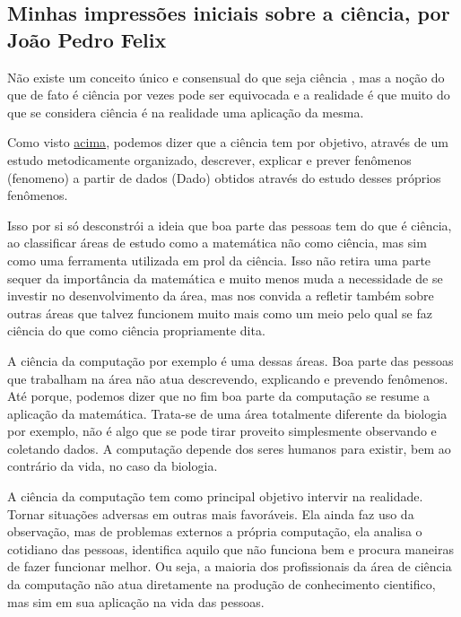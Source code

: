 \subsection{Minhas impressões iniciais sobre a ciência, por João Pedro Felix}

Não existe um conceito único e consensual do que seja ciência \citep{schwartzman_ciencia_1984}, mas a noção do que de fato é ciência por vezes pode ser equivocada e a realidade é que muito do que se considera ciência é na realidade uma aplicação da mesma.

Como visto \hyperlink{1-Introducao/aulas/Ciencia-e-sua-Avaliacao.pdf.2}{acima}, podemos dizer que a ciência tem por objetivo, através de um estudo metodicamente organizado, descrever, explicar e prever fenômenos (\gls{fenomeno}) a partir de dados (\gls{Dado}) obtidos através do estudo desses próprios fenômenos.

Isso por si só desconstrói a ideia que boa parte das pessoas tem do que é ciência, ao classificar áreas de estudo como a matemática não como ciência, mas sim como uma ferramenta utilizada em prol da ciência. Isso não retira uma parte sequer da importância da matemática e muito menos muda a necessidade de se investir no desenvolvimento da área, mas nos convida a refletir também sobre outras áreas que talvez funcionem muito mais como um meio pelo qual se faz ciência do que como ciência propriamente dita.

A ciência da computação por exemplo é uma dessas áreas. Boa parte das pessoas que trabalham na área não atua descrevendo, explicando e prevendo fenômenos. Até porque, podemos dizer que no fim boa parte da computação se resume a aplicação da matemática. Trata-se de uma área totalmente diferente da biologia por exemplo, não é algo que se pode tirar proveito simplesmente observando e coletando dados. A computação depende dos seres humanos para existir, bem ao contrário da vida, no caso da biologia.

A ciência da computação tem como principal objetivo intervir na realidade. Tornar situações adversas em outras mais favoráveis. Ela ainda faz uso da observação, mas de problemas externos a própria computação, ela analisa o cotidiano das pessoas, identifica aquilo que não funciona bem e procura maneiras de fazer funcionar melhor. Ou seja, a maioria dos profissionais da área de ciência da computação não atua diretamente na produção de conhecimento cientifico, mas sim em sua aplicação na vida das pessoas.


